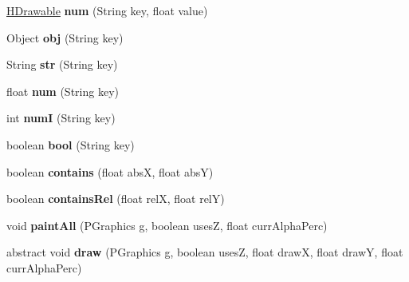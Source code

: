 \begin{DoxyCompactItemize}
\item 
\hypertarget{classhype_1_1drawable_1_1_h_drawable_a301762c66d0222fa940d766a5fc61d66}{\hyperlink{classhype_1_1drawable_1_1_h_drawable}{H\-Drawable} {\bfseries num} (String key, float value)}\label{classhype_1_1drawable_1_1_h_drawable_a301762c66d0222fa940d766a5fc61d66}

\item 
\hypertarget{classhype_1_1drawable_1_1_h_drawable_ae9ef9be1550351bb13884016ccc755f1}{Object {\bfseries obj} (String key)}\label{classhype_1_1drawable_1_1_h_drawable_ae9ef9be1550351bb13884016ccc755f1}

\item 
\hypertarget{classhype_1_1drawable_1_1_h_drawable_a0d2393ad2936ee21fbb73fe8044f8c03}{String {\bfseries str} (String key)}\label{classhype_1_1drawable_1_1_h_drawable_a0d2393ad2936ee21fbb73fe8044f8c03}

\item 
\hypertarget{classhype_1_1drawable_1_1_h_drawable_aaafb5307820159466ebf60658c7a325d}{float {\bfseries num} (String key)}\label{classhype_1_1drawable_1_1_h_drawable_aaafb5307820159466ebf60658c7a325d}

\item 
\hypertarget{classhype_1_1drawable_1_1_h_drawable_a78a4cb7304e24e1706d9f23d0a387b43}{int {\bfseries num\-I} (String key)}\label{classhype_1_1drawable_1_1_h_drawable_a78a4cb7304e24e1706d9f23d0a387b43}

\item 
\hypertarget{classhype_1_1drawable_1_1_h_drawable_a138a8d2253dbfccb39889cb01b452f7c}{boolean {\bfseries bool} (String key)}\label{classhype_1_1drawable_1_1_h_drawable_a138a8d2253dbfccb39889cb01b452f7c}

\item 
\hypertarget{classhype_1_1drawable_1_1_h_drawable_a6662671b3f2c3f96cdd8883e0eb21fd6}{boolean {\bfseries contains} (float abs\-X, float abs\-Y)}\label{classhype_1_1drawable_1_1_h_drawable_a6662671b3f2c3f96cdd8883e0eb21fd6}

\item 
\hypertarget{classhype_1_1drawable_1_1_h_drawable_a40eaa02f8f52fc6891d77affe8b8f146}{boolean {\bfseries contains\-Rel} (float rel\-X, float rel\-Y)}\label{classhype_1_1drawable_1_1_h_drawable_a40eaa02f8f52fc6891d77affe8b8f146}

\item 
\hypertarget{classhype_1_1drawable_1_1_h_drawable_a54e5a75afb23f49b37ce769a11d10fb0}{void {\bfseries paint\-All} (P\-Graphics g, boolean uses\-Z, float curr\-Alpha\-Perc)}\label{classhype_1_1drawable_1_1_h_drawable_a54e5a75afb23f49b37ce769a11d10fb0}

\item 
\hypertarget{classhype_1_1drawable_1_1_h_drawable_a8e0af2cfaa89a93b3dab6b5f0ecdf964}{abstract void {\bfseries draw} (P\-Graphics g, boolean uses\-Z, float draw\-X, float draw\-Y, float curr\-Alpha\-Perc)}\label{classhype_1_1drawable_1_1_h_drawable_a8e0af2cfaa89a93b3dab6b5f0ecdf964}

\end{DoxyCompactItemize}
